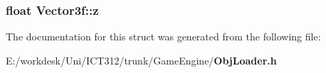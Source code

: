 \subsubsection[{z}]{\setlength{\rightskip}{0pt plus 5cm}float Vector3f\+::z}\label{struct_vector3f_a470cff51eb6463672be518f5af4e26db}


The documentation for this struct was generated from the following file\+:\begin{DoxyCompactItemize}
\item 
E\+:/workdesk/\+Uni/\+I\+C\+T312/trunk/\+Game\+Engine/{\bf Obj\+Loader.\+h}\end{DoxyCompactItemize}
